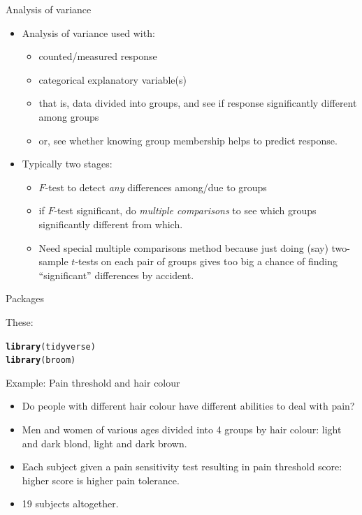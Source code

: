\documentclass[unknownkeysallowed]{beamer}\usepackage[]{graphicx}\usepackage[]{color}
\makeatletter
\newcommand{\hlstd}[1]{\textcolor[rgb]{0.345,0.345,0.345}{#1}}%
\newcommand{\hlkwd}[1]{\textcolor[rgb]{0.737,0.353,0.396}{\textbf{#1}}}%
\newenvironment{kframe}{%
 \def\at@end@of@kframe{}%
 \ifinner\ifhmode%
  \def\at@end@of@kframe{\end{minipage}}%
  \begin{minipage}{\columnwidth}%
 \fi\fi%
 \def\FrameCommand##1{\hskip\@totalleftmargin \hskip-\fboxsep
 \colorbox{shadecolor}{##1}\hskip-\fboxsep
     \hskip-\linewidth \hskip-\@totalleftmargin \hskip\columnwidth}%
 \MakeFramed {\advance\hsize-\width
   \@totalleftmargin\z@ \linewidth\hsize
   \@setminipage}}%
 {\par\unskip\endMakeFramed%
 \at@end@of@kframe}
\newenvironment{knitrout}{}{} %
\makeatother
\begin{document}
\begin{frame}[fragile]{Analysis of variance}

  \begin{itemize}
  \item Analysis of variance used with:
    \begin{itemize}
    \item counted/measured response
    \item categorical explanatory variable(s)
    \item that is, data divided into groups, and see if response significantly different among groups
    \item or, see whether knowing group membership helps to predict response.
    \end{itemize}
  \item Typically two stages:
    \begin{itemize}
    \item $F$-test to detect {\em any} differences among/due to groups
    \item if $F$-test significant, do {\em multiple comparisons} to see which groups significantly different from which.
    \item Need special multiple comparisons method because just doing (say) two-sample $t$-tests on each pair of groups gives too big a chance of finding ``significant'' differences by accident.
    \end{itemize}
  \end{itemize}
  
\end{frame}

\begin{frame}[fragile]{Packages}
  
  These:
  
\begin{knitrout}
\color{fgcolor}\begin{kframe}
\begin{alltt}
\hlkwd{library}\hlstd{(tidyverse)}
\hlkwd{library}\hlstd{(broom)}
\end{alltt}
\end{kframe}
\end{knitrout}
  
\end{frame}

\begin{frame}[fragile]{Example: Pain threshold and hair colour}
  
  \begin{itemize}
  \item Do people with different hair colour have different abilities
    to deal with pain?
  \item Men and women of various ages divided into 4 groups by hair
    colour: light and dark blond, light and dark brown.
  \item Each subject given a pain sensitivity test resulting in pain
    threshold score: higher score is higher pain tolerance.
  \item 19 subjects altogether.
  \end{itemize}

\end{frame}
\end{document}
